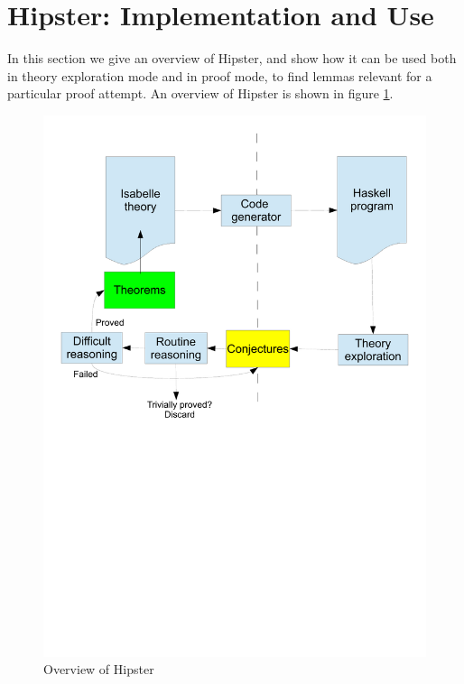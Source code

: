 \section{Hipster: Implementation and Use}
\label{sec:hipster}

In this section we give an overview of Hipster, and show how it can be used both in theory exploration mode and in proof mode, to find lemmas relevant for a particular proof attempt. An overview of Hipster is shown in figure \ref{fig:hipster}. 

\begin{figure}[htbp]
\begin{center}
\includegraphics[scale=0.45]{hipster}

\caption{Overview of Hipster}
\label{fig:hipster}
\end{center}
\end{figure}

